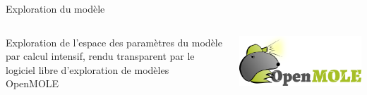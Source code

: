\documentclass{beamer}
\begin{document}
\begin{frame}{}
\begin{columns}[t]
\begin{column}{.49\textwidth}
        \begin{block}{Exploration du modèle}
        \begin{columns}[t]
        \begin{column}{.6\textwidth}
        	\begin{justify}
        	\vspace{-6cm}
        	Exploration de l'espace des paramètres du modèle par calcul intensif, rendu transparent par le logiciel libre d'exploration de modèles OpenMOLE \cite{reuillon2013openmole}
        	\end{justify}
        \end{column}
		\begin{column}{.35\textwidth}
			\centering
        	\includegraphics[width=\columnwidth]{figures/openmole4.png}
        \end{column}
        \end{columns}
        \end{block}

        
        
%                    
%          
%
%          
%           
%        
        

\end{column}
\end{columns}
\end{frame}
\end{document}

